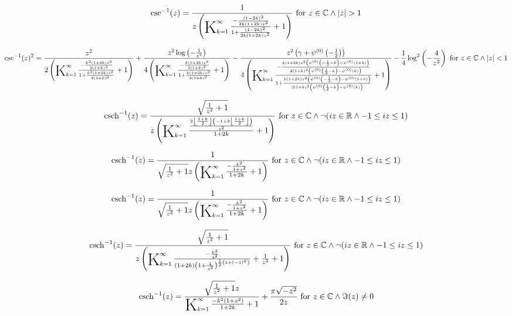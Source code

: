 \documentclass{article}
\newcommand{\bigK}{\mathop{\raisebox{-5pt}{\huge K}}}
\begin{document}
\[\csc ^{-1}(z)=\frac{1}{z \left(\bigK_{k=1}^{\infty}\frac{-\frac{(1-2 k)^2}{2 k (1+2 k) z^2}}{1+\frac{(1-2 k)^2}{2 k (1+2 k) z^2}}+1\right)}\text{ for }z\in \mathbb{C}\land \left| z\right| >1\] 

\[\csc ^{-1}(z)^2=\frac{z^2}{2 \left(\bigK_{k=1}^{\infty}\frac{-\frac{k^2 (1+2 k) z^2}{2 (1+k)^3}}{1+\frac{k^2 (1+2 k) z^2}{2 (1+k)^3}}+1\right)}+\frac{z^2 \log \left(-\frac{1}{z^2}\right)}{4 \left(\bigK_{k=1}^{\infty}\frac{-\frac{k (1+2 k) z^2}{2 (1+k)^2}}{1+\frac{k (1+2 k) z^2}{2 (1+k)^2}}+1\right)}-\frac{z^2 \left(\gamma +\psi ^{(0)}\left(-\frac{1}{2}\right)\right)}{4 \left(\bigK_{k=1}^{\infty}\frac{-\frac{k (1+2 k) z^2 \left(\psi ^{(0)}\left(-\frac{1}{2}-k\right)-\psi ^{(0)}(1+k)\right)}{2 (1+k)^2 \left(\psi ^{(0)}\left(\frac{1}{2}-k\right)-\psi ^{(0)}(k)\right)}}{1+\frac{k (1+2 k) z^2 \left(\psi ^{(0)}\left(-\frac{1}{2}-k\right)-\psi ^{(0)}(1+k)\right)}{2 (1+k)^2 \left(\psi ^{(0)}\left(\frac{1}{2}-k\right)-\psi ^{(0)}(k)\right)}}+1\right)}-\frac{1}{4} \log ^2\left(-\frac{4}{z^2}\right)\text{ for }z\in \mathbb{C}\land \left| z\right| <1\] 

\[\text{csch}^{-1}(z)=\frac{\sqrt{\frac{1}{z^2}+1}}{z \left(\bigK_{k=1}^{\infty}\frac{\frac{2 \left\lfloor \frac{1+k}{2}\right\rfloor  \left(-1+2 \left\lfloor \frac{1+k}{2}\right\rfloor \right)}{z^2}}{1+2 k}+1\right)}\text{ for }z\in \mathbb{C}\land \neg (i z\in \mathbb{R}\land -1\leq i z\leq 1)\] 

\[\text{csch}^{-1}(z)=\frac{1}{\sqrt{\frac{1}{z^2}+1} z \left(\bigK_{k=1}^{\infty}\frac{-\frac{k^2}{1+z^2}}{1+2 k}+1\right)}\text{ for }z\in \mathbb{C}\land \neg (i z\in \mathbb{R}\land -1\leq i z\leq 1)\] 

\[\text{csch}^{-1}(z)=\frac{1}{\sqrt{\frac{1}{z^2}+1} z \left(\bigK_{k=1}^{\infty}\frac{-\frac{k^2}{1+z^2}}{1+2 k}+1\right)}\text{ for }z\in \mathbb{C}\land \neg (i z\in \mathbb{R}\land -1\leq i z\leq 1)\] 

\[\text{csch}^{-1}(z)=\frac{\sqrt{\frac{1}{z^2}+1}}{z \left(\bigK_{k=1}^{\infty}\frac{-\frac{k^2}{z^2}}{(1+2 k) \left(1+\frac{1}{z^2}\right)^{\frac{1}{2} \left(1+(-1)^k\right)}}+\frac{1}{z^2}+1\right)}\text{ for }z\in \mathbb{C}\land \neg (i z\in \mathbb{R}\land -1\leq i z\leq 1)\] 

\[\text{csch}^{-1}(z)=\frac{\sqrt{\frac{1}{z^2}+1} z}{\bigK_{k=1}^{\infty}\frac{-k^2 \left(1+z^2\right)}{1+2 k}+1}+\frac{\pi  \sqrt{-z^2}}{2 z}\text{ for }z\in \mathbb{C}\land \Im(z)\neq 0\] 
\end{document}
